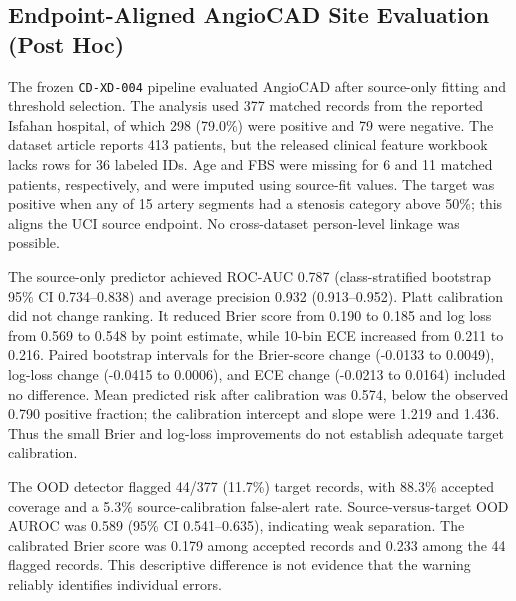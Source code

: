 \documentclass[journal]{IEEEtran}
\begin{document}
\subsection{Endpoint-Aligned AngioCAD Site Evaluation (Post Hoc)}
The frozen \texttt{CD-XD-004} pipeline evaluated AngioCAD after source-only
fitting and threshold selection. The analysis used 377 matched records from
the reported Isfahan hospital, of which 298 (79.0\%) were positive and 79 were
negative. The dataset article reports 413 patients, but the released clinical
feature workbook lacks rows for 36 labeled IDs. Age and FBS were missing for 6
and 11 matched patients, respectively, and were imputed using source-fit
values. The target was positive when any of 15 artery segments had a stenosis
category above 50\%; this aligns the UCI source endpoint. No cross-dataset
person-level linkage was possible.

The source-only predictor achieved ROC-AUC 0.787 (class-stratified bootstrap
95\% CI 0.734--0.838) and average precision 0.932 (0.913--0.952). Platt
calibration did not change ranking. It reduced Brier score from 0.190 to 0.185
and log loss from 0.569 to 0.548 by point estimate, while 10-bin ECE increased
from 0.211 to 0.216. Paired bootstrap intervals for the Brier-score change
(-0.0133 to 0.0049), log-loss change (-0.0415 to 0.0006), and ECE change
(-0.0213 to 0.0164) included no difference. Mean predicted risk after
calibration was 0.574, below the observed 0.790 positive fraction; the
calibration intercept and slope were 1.219 and 1.436. Thus the small Brier and
log-loss improvements do not establish adequate target calibration.

The OOD detector flagged 44/377 (11.7\%) target records, with 88.3\% accepted
coverage and a 5.3\% source-calibration false-alert rate. Source-versus-target
OOD AUROC was 0.589 (95\% CI 0.541--0.635), indicating weak separation. The
calibrated Brier score was 0.179 among accepted records and 0.233 among the 44
flagged records. This descriptive difference is not evidence that the warning
reliably identifies individual errors.
\end{document}
